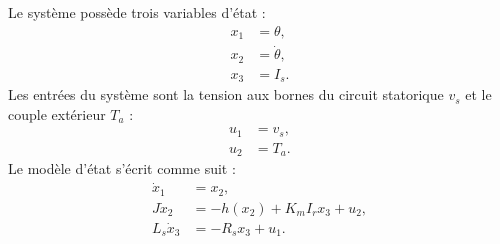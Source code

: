 \noindent Le système possède trois variables d'état :
\begin{equation*} \begin{split}
x_1 &= \theta, \\
x_2 &= \dot{\theta}, \\
x_3 &= I_s. 
\end{split} \end{equation*}
Les entrées du système sont la tension aux bornes du circuit statorique
$v_s$ et le couple extérieur $T_a$ : 
\begin{equation*} \begin{split}
u_1 &= v_s, \\
u_2 &= T_a.
\end{split} \end{equation*}
Le modèle d'état s'écrit comme suit :
\begin{equation*} \begin{split}
\dot x_1 &= x_2,\\
J\dot x_2 &= -h(x_2) + K_m I_r x_3 + u_2,\\
L_s\dot x_3 &= -R_s x_3 +u_1.
\end{split} \end{equation*}
\\

